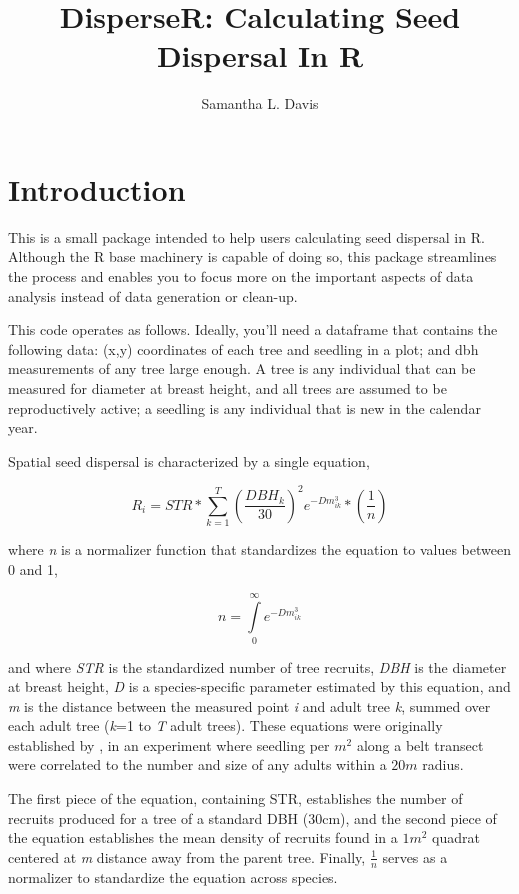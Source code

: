 \documentclass{article}
\title{DisperseR: Calculating Seed Dispersal In R}
\author{Samantha L. Davis}
\begin{document}
\maketitle
\tableofcontents


\section{Introduction}

This is a small package intended to help users calculating seed dispersal in R. Although the R base machinery is capable of doing so, this package streamlines the process and enables you to focus more on the important aspects of data analysis instead of data generation or clean-up.

This code operates as follows. Ideally, you'll need a dataframe that contains the following data: (x,y) coordinates of each tree and seedling in a plot; and dbh measurements of any tree large enough. A tree is any individual that can be measured for diameter at breast height, and all trees are assumed to be reproductively active; a seedling is any individual that is new in the calendar year.

Spatial seed dispersal is characterized by a single equation,

\begin{equation}
\label{eq:dispersal}
R_i = STR * \sum\limits_{k=1}^T\left( \frac{DBH_k}{30}\right) ^2 e^{-Dm_{ik}^3} * \left( \frac{1}{n}\right)
\end{equation}

where \textit{n} is a normalizer function that standardizes the equation to values between 0 and 1,

\begin{equation}
n = \int\limits_{0}^\infty e^{-Dm_{ik}^3} \nonumber
\end{equation}

and where \textit{STR} is the standardized number of tree recruits, \textit{DBH} is the diameter at breast height, \textit{D} is a species-specific parameter estimated by this equation, and \textit{m} is the distance between the measured point \textit{i} and adult tree \textit{k}, summed over each adult tree (\textit{k}=1 to \textit{T} adult trees). These equations were originally established by \citet{Ribbens1994}, in an experiment where seedling per $m^2$ along a belt transect were correlated to the number and size of any adults within a $20 m$ radius.

The first piece of the equation, containing STR, establishes the number of recruits produced for a tree of a standard DBH (30cm), and the second piece of the equation establishes the mean density of recruits found in a $1 m^2$ quadrat centered at \textit{m} distance away from the parent tree. Finally, $\frac{1}{n}$ serves as a normalizer to standardize the equation across species.
\end{document}

